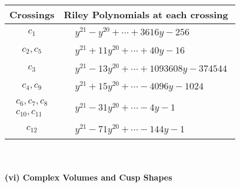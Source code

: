 \documentclass[1p]{elsarticle_modified}
\theoremstyle{definition}
\begin{document}
\begin{tabular}{m{50pt}|m{274pt}}
Crossings & \hspace{64pt}Riley Polynomials at each crossing \\
\hline $$\begin{aligned}c_{1}\end{aligned}$$&$\begin{aligned}
&y^{21}- y^{20}+\cdots+3616 y-256
\end{aligned}$\\
\hline $$\begin{aligned}c_{2},c_{5}\end{aligned}$$&$\begin{aligned}
&y^{21}+11 y^{20}+\cdots+40 y-16
\end{aligned}$\\
\hline $$\begin{aligned}c_{3}\end{aligned}$$&$\begin{aligned}
&y^{21}-13 y^{20}+\cdots+1093608 y-374544
\end{aligned}$\\
\hline $$\begin{aligned}c_{4},c_{9}\end{aligned}$$&$\begin{aligned}
&y^{21}+15 y^{20}+\cdots-4096 y-1024
\end{aligned}$\\
\hline $$\begin{aligned}c_{6},c_{7},c_{8}\\c_{10},c_{11}\end{aligned}$$&$\begin{aligned}
&y^{21}-31 y^{20}+\cdots-4 y-1
\end{aligned}$\\
\hline $$\begin{aligned}c_{12}\end{aligned}$$&$\begin{aligned}
&y^{21}-71 y^{20}+\cdots-144 y-1
\end{aligned}$\\
\hline
\end{tabular}\\~\\
\newpage\flushleft \textbf{(vi) Complex Volumes and Cusp Shapes}
\end{document}

